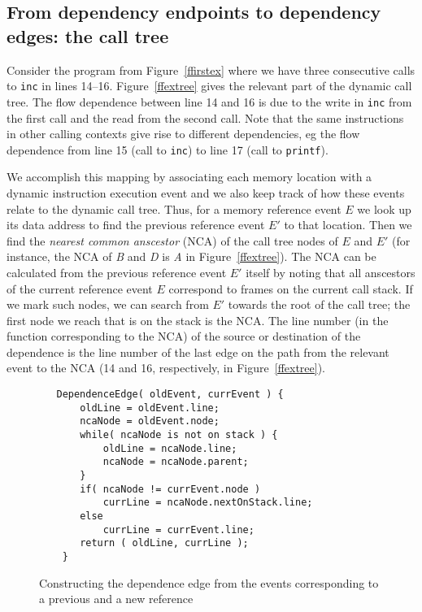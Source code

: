 \subsection{From dependency endpoints to dependency edges: the call tree}

Consider the program from Figure~\ref{ffirstex} where we have three consecutive
calls to {\tt inc} in lines 14--16. Figure~\ref{ffextree} gives the relevant 
part of the dynamic call tree. The flow dependence between line 14 and 16 is due 
to the write in {\tt inc} from the first call and the read from the second call.
Note that the same instructions in other calling contexts give rise to 
different dependencies, eg the flow dependence from line 15 (call to {\tt inc})
to line 17 (call to {\tt printf}).

We accomplish this mapping by associating each memory location with a dynamic
instruction execution event and we also keep track of how these events 
relate to the dynamic call tree. Thus, for a memory reference event $E$ we 
look up its data address to find the previous reference event $E'$ to that 
location. Then we find the {\em nearest common anscestor} (NCA) of the call
tree nodes of $E$ and $E'$ (for instance, the NCA of {\it B} and {\it D} is
{\it A} in Figure~\ref{ffextree}). The NCA can be calculated from the previous
reference event $E'$ itself by noting that all anscestors of the current
reference event $E$ correspond to frames on the current call stack. If we mark 
such nodes, we can search from $E'$ 
towards the root of the call tree; the first node we reach that is on the 
stack is the NCA.
The line number (in the function corresponding to the NCA) of the source or 
destination of the dependence is the line number of the last edge on the path 
from the relevant event to the NCA (14 and 16, respectively, in 
Figure~\ref{ffextree}).


\begin{figure}
\small
\hrulefill
\begin{verbatim}
   DependenceEdge( oldEvent, currEvent ) {
       oldLine = oldEvent.line;
       ncaNode = oldEvent.node;
       while( ncaNode is not on stack ) {
           oldLine = ncaNode.line;
           ncaNode = ncaNode.parent;
       }
       if( ncaNode != currEvent.node )
           currLine = ncaNode.nextOnStack.line;
       else
           currLine = currEvent.line;
       return ( oldLine, currLine );
    }
\end{verbatim}
\hrulefill
\caption{Constructing the dependence edge from the events corresponding
to a previous and a new reference}
\label{fdepedge}
\end{figure}    

